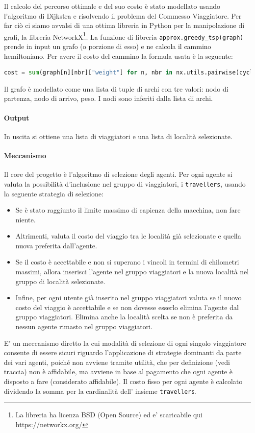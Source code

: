 \documentclass{article}
\begin{document}
Il calcolo del percorso ottimale e del suo costo è stato modellato usando l'algoritmo di Dijkstra e risolvendo il problema del Commesso Viaggiatore. Per far ciò ci siamo avvalsi di una ottima libreria in Python per la manipolazione di grafi, la libreria NetworkX\footnote{La libreria ha licenza BSD (Open Source) ed e' scaricabile qui https://networkx.org/}. La funzione di libreria \verb|approx.greedy_tsp(graph)| prende in input un grafo (o porzione di esso) e ne calcola il cammino hemiltoniano.
Per avere il costo del cammino la formula usata è la seguente:
\begin{lstlisting}[language=Python]
cost = sum(graph[n][nbr]["weight"] for n, nbr in nx.utils.pairwise(cycle))
\end{lstlisting}
Il grafo è modellato come una lista di tuple di archi con tre valori: nodo di partenza, nodo di arrivo, peso. 
I nodi sono inferiti dalla lista di archi. 
\paragraph*{Output}
In uscita si ottiene una lista di viaggiatori e una lista di località selezionate.
\paragraph*{Meccanismo}
Il core del progetto è l'algoritmo di selezione degli agenti. Per ogni agente si valuta la possibilità d'inclusione nel gruppo di viaggiatori, i \verb|travellers|, usando la seguente strategia di selezione:
\begin{itemize}
\item Se è stato raggiunto il limite massimo di capienza della macchina, non fare niente.
\item Altrimenti, valuta il costo del viaggio tra le località già selezionate e quella nuova preferita dall'agente. 
\item Se il costo è accettabile e non si superano i vincoli in termini di chilometri massimi, allora inserisci l'agente nel gruppo viaggiatori e la nuova località nel gruppo di località selezionate. 
\item Infine, per ogni utente già inserito nel gruppo viaggiatori valuta se il nuovo costo del viaggio è accettabile e se non dovesse esserlo elimina l'agente dal gruppo viaggiatori. Elimina anche la località scelta se non è preferita da nessun agente rimasto nel gruppo viaggiatori. 
\end{itemize}
E' un meccanismo diretto la cui modalità di selezione di ogni singolo viaggiatore consente di essere sicuri riguardo l'applicazione di strategie dominanti da parte dei vari agenti, poiché non avviene tramite utilità, che per definizione (vedi traccia) non è affidabile, ma avviene in base al pagamento che ogni agente è disposto a fare (considerato affidabile).
Il costo fisso per ogni agente è calcolato dividendo la somma per la cardinalità dell' insieme \verb|travellers|.
\end{document}
